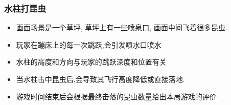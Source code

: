 \documentclass[11pt]{article}
\providecommand{\tightlist}{%
      \setlength{\itemsep}{0pt}\setlength{\parskip}{0pt}}
\begin{document}
    

    \subsubsection{水柱打昆虫}\label{ux6c34ux67f1ux6253ux6606ux866b}

    \begin{itemize}
\tightlist
\item
  画面场景是一个草坪, 草坪上有一些喷泉口, 画面中间飞着很多昆虫.
\item
  玩家在蹦床上的每一次跳跃,会引发喷水口喷水
\item
  水柱的高度和方向与玩家的跳跃深度和位置有关
\item
  当水柱击中昆虫后,会导致其飞行高度降低或直接落地.
\item
  游戏时间结束后会根据最终击落的昆虫数量给出本局游戏的评价
\end{itemize}

    


    
    
    
    
\end{document}
